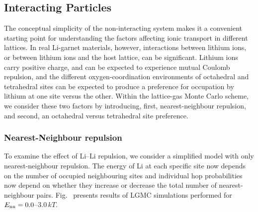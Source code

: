 \documentclass[aps,prb,twocolumn,superscriptaddress,reprint]{revtex4-1}
\newcommand{\xLi}{x_\m{Li}}
\begin{document}
\subsection{Interacting Particles}

The conceptual simplicity of the non-interacting system makes it a convenient starting point for understanding the factors affecting ionic transport in different lattices. 
In real Li-garnet materials, however, interactions between lithium ions, or between lithium ions and the host lattice, can be significant. 
Lithium ions carry positive charge, and can be expected to experience mutual Coulomb repulsion, and the different oxygen-coordination environments of octahedral and tetrahedral sites can be expected to produce a preference for occupation by lithium at one site versus the other. 
Within the lattice-gas Monte Carlo scheme, we consider these two factors by introducing, first, nearest-neighbour repulsion, and second, an octahedral versus tetrahedral site preference.


\subsubsection{Nearest-Neighbour repulsion}

To examine the effect of Li--Li repulsion, we consider a simplified model with only nearest-neighbour repulsion. 
The energy of Li at each specific site now depends on the number of occupied neighbouring sites and individual hop probabilities now depend on whether they increase or decrease the total number of nearest-neighbour pairs. 
Fig.~ presents results of LGMC simulations performed for $E_{\mathrm{nn}}=0.0$--$3.0\,kT$. 
\end{document}
